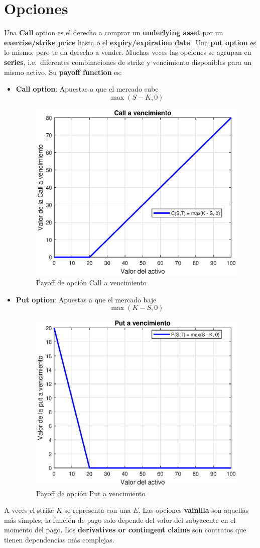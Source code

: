 

\section{Opciones}
Una \textbf{Call} option es el derecho a comprar un \textbf{underlying asset} por un \textbf{exercise/strike price} hasta o el \textbf{expiry/expiration date}.\ Una \textbf{put option} es lo mismo, pero te da derecho a vender. Muchas veces las opciones se agrupan en \textbf{series}, i.e.\ diferentes combinaciones de strike y vencimiento disponibles para un mismo activo. Su \textbf{payoff function} es:
\begin{itemize}
    \item \textbf{Call option}: Apuestas a que el mercado sube
    \[\boxed{\max(S-K, 0)}\]
    \begin{figure}[H]
        \centering
        \includegraphics[width=0.5\linewidth]{Imagenes/2_Derivados/PayOffCall.eps}
        \caption{Payoff de opción Call a vencimiento}
    \end{figure}
    \item \textbf{Put option}: Apuestas a que el mercado baje
    \[\boxed{\max(K-S, 0)}\]
    \begin{figure}[H]
        \centering
        \includegraphics[width=0.5\linewidth]{Imagenes/2_Derivados/PayOffPut.eps}
        \caption{Payoff de opción Put a vencimiento}
    \end{figure}
\end{itemize}
A veces el strike $K$ se representa con una $E$. Las opciones \textbf{vainilla} son aquellas más simples; la función de pago solo depende del valor del subyacente en el momento del pago. Los \textbf{derivatives or contingent claims} son contratos que tienen dependencias más complejas.


